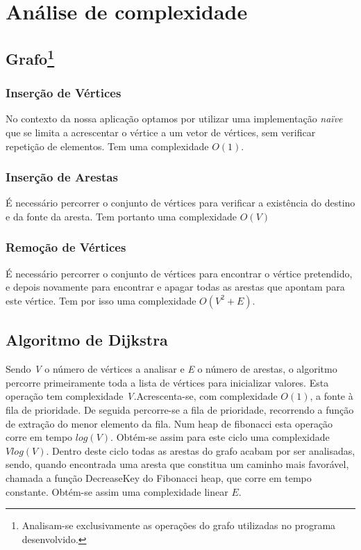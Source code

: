 \documentclass[a4paper,12pt,titlepage]{article}
\begin{document}
\section{Análise de complexidade}
\subsection[Grafo]{Grafo\footnote{Analisam-se exclusivamente as operações do grafo utilizadas no programa desenvolvido.}}

\subsubsection{Inserção de Vértices}
No contexto da nossa aplicação optamos por utilizar uma implementação \emph{naïve} que se limita a acrescentar o vértice a um vetor de vértices, sem verificar repetição de elementos. Tem uma complexidade $O(1)$.

\subsubsection{Inserção de Arestas}
É necessário percorrer o conjunto de vértices para verificar a existência do destino e da fonte da aresta. Tem portanto uma complexidade $O(V)$

\subsubsection{Remoção de Vértices}
É necessário percorrer o conjunto de vértices para encontrar o vértice pretendido, e depois novamente para encontrar e apagar todas as arestas que apontam para este vértice. Tem por isso uma complexidade $O(V^2+E)$.


\subsection{Algoritmo de Dijkstra}
Sendo \emph{V} o número de vértices a analisar e \emph{E} o número de arestas, o algoritmo percorre primeiramente toda a lista de vértices para inicializar valores. Esta operação tem complexidade \emph{V}.Acrescenta-se, com complexidade $O(1)$, a fonte à fila de prioridade. De seguida percorre-se a fila de prioridade, recorrendo a função de extração do menor elemento da fila. Num heap de fibonacci esta operação corre em tempo $log(V)$. Obtém-se assim para este ciclo uma complexidade $Vlog(V)$. Dentro deste ciclo todas as arestas do grafo acabam por ser analisadas, sendo, quando encontrada uma aresta que constitua um caminho mais favorável, chamada a função DecreaseKey do Fibonacci heap, que corre em tempo constante. Obtém-se assim uma complexidade linear $E$.
\end{document}
